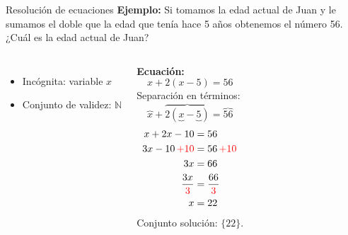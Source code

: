 \documentclass[9pt, aspectratio=169]{beamer}
\begin{document}
\begin{frame}{Resolución de ecuaciones}
    \textbf{Ejemplo:} Si tomamos la edad actual de Juan y le sumamos el doble que la edad que tenía hace 5 años obtenemos el número 56. ¿Cuál es la edad actual de Juan?
\begin{columns}
\cx
\begin{itemize}
    \item Incógnita: variable $x$
    \item Conjunto de validez: $\mathbb{N}$
\end{itemize}
\textbf{Ecuación:}
\[ x + 2(x-5) = 56 \]
Separación en términos:
\[ \overbrace{x} + \overbrace{2 (\underbrace{x} - \underbrace{5})} = \overbrace{56} \]
 \cx
 \begin{align*}
     x + 2x - 10 &= 56\\
     3x - 10 {\color{red}\, + 10} &= 56 {\color{red} \, + 10} \\
     3x &= 66 \\
     \frac{3x}{\color{red}3} &= \frac{66}{\color{red}3} \\
     x &= 22
 \end{align*}
 Conjunto solución: $\{22\}$.
\end{columns}
\end{frame}
\end{document}
